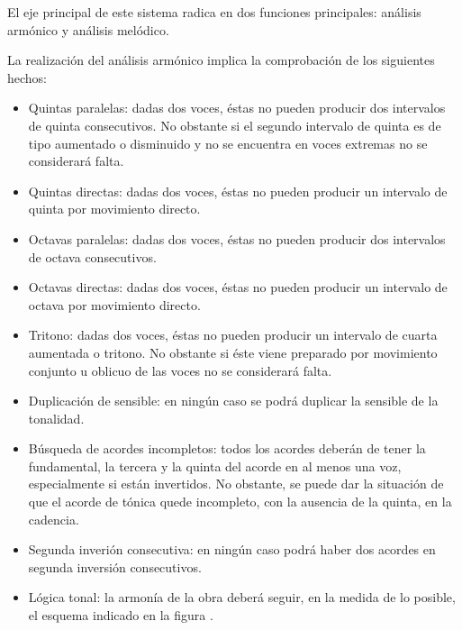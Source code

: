 El eje principal de este sistema radica en dos funciones principales: análisis armónico y análisis melódico.

La realización del análisis armónico implica la comprobación de los siguientes hechos:

\begin{itemize}

	\item Quintas paralelas: dadas dos voces, éstas no pueden producir dos intervalos de quinta consecutivos. No obstante si el segundo intervalo de quinta es de tipo aumentado o disminuido y no se encuentra en voces extremas no se considerará falta.

	\item Quintas directas: dadas dos voces, éstas no pueden producir un intervalo de quinta por movimiento directo.

	\item Octavas paralelas: dadas dos voces, éstas no pueden producir dos intervalos de octava consecutivos. 

	\item Octavas directas: dadas dos voces, éstas no pueden producir un intervalo de octava por movimiento directo.

	\item Tritono: dadas dos voces, éstas no pueden producir un intervalo de cuarta aumentada o tritono. No obstante si éste viene preparado por movimiento conjunto u oblicuo de las voces no se considerará falta.

	\item Duplicación de sensible: en ningún caso se podrá duplicar la sensible de la tonalidad. 

	\item Búsqueda de acordes incompletos: todos los acordes deberán de tener la fundamental, la tercera y la quinta del acorde en al menos una voz, especialmente si están invertidos. No obstante, se puede dar la situación de que el acorde de tónica quede incompleto, con la ausencia de la quinta, en la cadencia.

	\item Segunda inverión consecutiva: en ningún caso podrá haber dos acordes en segunda inversión consecutivos.

	\item Lógica tonal: la armonía de la obra deberá seguir, en la medida de lo posible, el esquema indicado en la figura .

		\begin{itemize}


\end{itemize}
\end{itemize}
